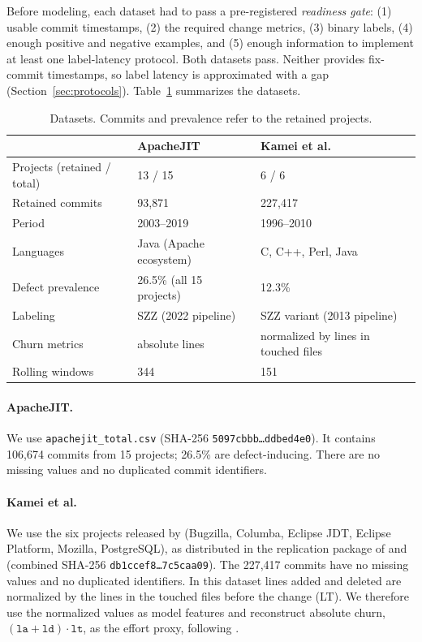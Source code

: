 Before modeling, each dataset had to pass a pre-registered \emph{readiness gate}: (1) usable commit timestamps, (2) the required change metrics, (3) binary labels, (4) enough positive and negative examples, and (5) enough information to implement at least one label-latency protocol. Both datasets pass. Neither provides fix-commit timestamps, so label latency is approximated with a gap (Section~\ref{sec:protocols}). Table~\ref{tab:datasets} summarizes the datasets.

\begin{table}[t]
\centering
\caption{Datasets. Commits and prevalence refer to the retained projects.}
\label{tab:datasets}
\small
\begin{tabular}{lll}
\toprule
 & ApacheJIT \citep{keshavarz2022} & Kamei et al.\ \citep{kamei2013} \\
\midrule
Projects (retained / total) & 13 / 15 & 6 / 6 \\
Retained commits & 93{,}871 & 227{,}417 \\
Period & 2003--2019 & 1996--2010 \\
Languages & Java (Apache ecosystem) & C, C++, Perl, Java \\
Defect prevalence & 26.5\% (all 15 projects) & 12.3\% \\
Labeling & SZZ (2022 pipeline) & SZZ variant (2013 pipeline) \\
Churn metrics & absolute lines & normalized by lines in touched files \\
Rolling windows & 344 & 151 \\
\bottomrule
\end{tabular}
\end{table}

\paragraph{ApacheJIT.} We use \texttt{apachejit\_total.csv} (SHA-256 \texttt{5097cbbb\ldots ddbed4e0}). It contains 106{,}674 commits from 15 projects; 26.5\% are defect-inducing. There are no missing values and no duplicated commit identifiers.

\paragraph{Kamei et al.} We use the six projects released by \citet{kamei2013} (Bugzilla, Columba, Eclipse JDT, Eclipse Platform, Mozilla, PostgreSQL), as distributed in the replication package of \citet{yang2016} and \citet{fu2017} (combined SHA-256 \texttt{db1ccef8\ldots 7c5caa09}). The 227{,}417 commits have no missing values and no duplicated identifiers. In this dataset lines added and deleted are normalized by the lines in the touched files before the change (LT). We therefore use the normalized values as model features and reconstruct absolute churn, $(\texttt{la}+\texttt{ld})\cdot\texttt{lt}$, as the effort proxy, following \citet{yang2016}.

